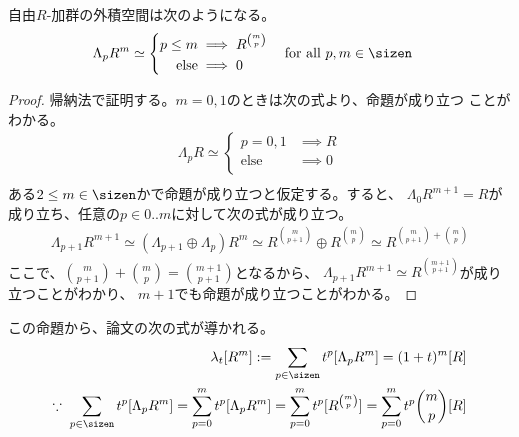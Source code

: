 {	\begin{proposition}[自由加群の外積]\label{prop:自由加群の外積} %
		自由$R$-加群の外積空間は次のようになる。
		\begin{equation*}\begin{split}
			\Lambda_pR^m &\simeq \left\{\begin{split}
				p\le m &\implies R^{\binom{m}{p}} \\
				\text{else} &\implies 0 \\
			\end{split}\right. \quad\text{for all } p,m\in\sizen
		\end{split}\end{equation*}
	\end{proposition} %
	\begin{proof} 帰納法で証明する。$m=0,1$のときは次の式より、命題が成り立つ
	ことがわかる。
	\begin{equation*}\begin{split}
		\Lambda_pR \simeq \left\{\begin{split}
			p=0,1 &\implies R \\
			\text{else} &\implies 0 \\
		\end{split}\right. \\ %
	\end{split}\end{equation*}
	ある$2\le m\in\sizen$かで命題が成り立つと仮定する。すると、
	$\Lambda_0R^{m+1}=R$が成り立ち、任意の$p\in0..m$に対して次の式が成り立つ。
	\begin{equation*}\begin{split}
		\Lambda_{p+1}R^{m+1} \simeq (\Lambda_{p+1}\oplus\Lambda_p)R^m
		\simeq R^{\binom{m}{p+1}}\oplus R^{\binom{m}{p}}
		\simeq R^{\binom{m}{p+1}+\binom{m}{p}}
	\end{split}\end{equation*}
	ここで、$\binom{m}{p+1}+\binom{m}{p}=\binom{m+1}{p+1}$となるから、
	$\Lambda_{p+1}R^{m+1}\simeq R^{\binom{m+1}{p+1}}$が成り立つことがわかり、
	$m+1$でも命題が成り立つことがわかる。
	\end{proof}

	この命題から、論文\cite{Grayson1978Gro}の次の式が導かれる。
	\begin{equation*}\begin{split}
		\lambda_t[R^m] := \sum_{p\in\sizen}t^p[\Lambda_pR^m] = (1 + t)^m[R] \\
		\because\; \sum_{p\in\sizen}t^p[\Lambda_pR^m]
		= \sum_{p=0}^mt^p[\Lambda_pR^m]
		= \sum_{p=0}^mt^p[R^{\binom{m}{p}}]
		= \sum_{p=0}^mt^p\binom{m}{p}[R]
	\end{split}\end{equation*}
}
